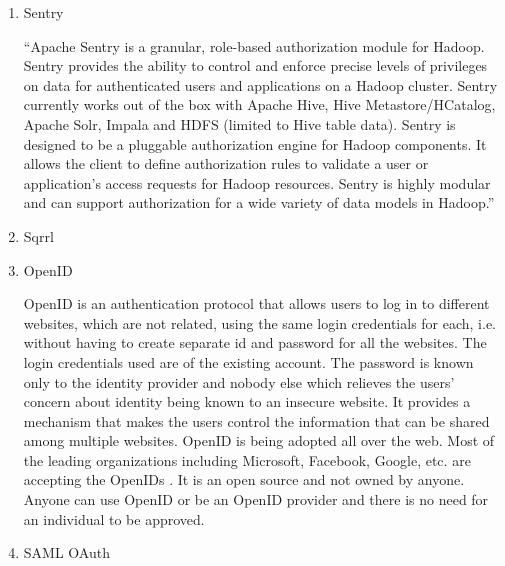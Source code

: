 \begin{enumerate}
\item {} 
Sentry

\label{\detokenize{i524/technologies:id679}}{\hyperref[\detokenize{i524/technologies:www-sentry}]{\sphinxcrossref{{[}590{]}}}} ``Apache Sentry is a granular, role-based authorization
module for Hadoop. Sentry provides the ability to control and enforce
precise levels of privileges on data for authenticated users and
applications on a Hadoop cluster. Sentry currently works out of the box
with Apache Hive, Hive Metastore/HCatalog, Apache Solr, Impala and HDFS
(limited to Hive table data). Sentry is designed to be a pluggable
authorization engine for Hadoop components. It allows the client to define
authorization rules to validate a user or application’s access requests
for Hadoop resources. Sentry is highly modular and can support authorization
for a wide variety of data models in Hadoop.''

\item {} 
Sqrrl

\item {} 
OpenID

OpenID is an authentication protocol that allows users to log in
to different websites, which are not related, using the same
login credentials for each, i.e. without having to create
separate id and password for all the websites. The login
credentials used are of the existing account. The password is
known only to the identity provider and nobody else which
relieves the users’ concern about identity being known to an
insecure website. \label{\detokenize{i524/technologies:id680}}{\hyperref[\detokenize{i524/technologies:ope1}]{\sphinxcrossref{{[}591{]}}}} It provides a mechanism that makes
the users control the information that can be shared among
multiple websites. OpenID is being adopted all over the web. Most
of the leading organizations including Microsoft, Facebook,
Google, etc. are accepting the OpenIDs \label{\detokenize{i524/technologies:id681}}{\hyperref[\detokenize{i524/technologies:ope2}]{\sphinxcrossref{{[}592{]}}}}. It is an
open source and not owned by anyone. Anyone can use OpenID or be
an OpenID provider and there is no need for an individual to be
approved.

\item {} 
SAML OAuth


\end{enumerate}
